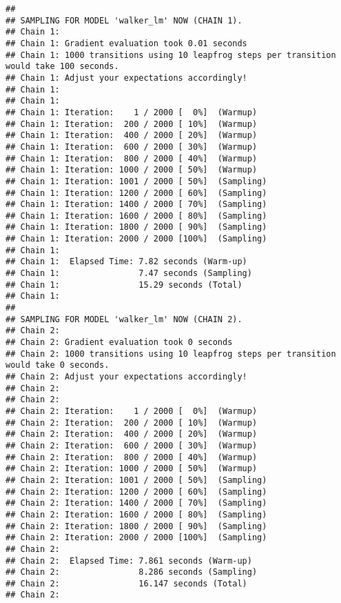 \documentclass[
]{book}
\newenvironment{Shaded}{\begin{snugshade}}{\end{snugshade}}
\newcommand{\AttributeTok}[1]{\textcolor[rgb]{0.77,0.63,0.00}{#1}}
\newcommand{\CommentTok}[1]{\textcolor[rgb]{0.56,0.35,0.01}{\textit{#1}}}
\newcommand{\DecValTok}[1]{\textcolor[rgb]{0.00,0.00,0.81}{#1}}
\newcommand{\FloatTok}[1]{\textcolor[rgb]{0.00,0.00,0.81}{#1}}
\newcommand{\FunctionTok}[1]{\textcolor[rgb]{0.00,0.00,0.00}{#1}}
\newcommand{\NormalTok}[1]{#1}
\newcommand{\SpecialCharTok}[1]{\textcolor[rgb]{0.00,0.00,0.00}{#1}}
\newcommand{\StringTok}[1]{\textcolor[rgb]{0.31,0.60,0.02}{#1}}
\begin{document}
\begin{verbatim}
## 
## SAMPLING FOR MODEL 'walker_lm' NOW (CHAIN 1).
## Chain 1: 
## Chain 1: Gradient evaluation took 0.01 seconds
## Chain 1: 1000 transitions using 10 leapfrog steps per transition would take 100 seconds.
## Chain 1: Adjust your expectations accordingly!
## Chain 1: 
## Chain 1: 
## Chain 1: Iteration:    1 / 2000 [  0%]  (Warmup)
## Chain 1: Iteration:  200 / 2000 [ 10%]  (Warmup)
## Chain 1: Iteration:  400 / 2000 [ 20%]  (Warmup)
## Chain 1: Iteration:  600 / 2000 [ 30%]  (Warmup)
## Chain 1: Iteration:  800 / 2000 [ 40%]  (Warmup)
## Chain 1: Iteration: 1000 / 2000 [ 50%]  (Warmup)
## Chain 1: Iteration: 1001 / 2000 [ 50%]  (Sampling)
## Chain 1: Iteration: 1200 / 2000 [ 60%]  (Sampling)
## Chain 1: Iteration: 1400 / 2000 [ 70%]  (Sampling)
## Chain 1: Iteration: 1600 / 2000 [ 80%]  (Sampling)
## Chain 1: Iteration: 1800 / 2000 [ 90%]  (Sampling)
## Chain 1: Iteration: 2000 / 2000 [100%]  (Sampling)
## Chain 1: 
## Chain 1:  Elapsed Time: 7.82 seconds (Warm-up)
## Chain 1:                7.47 seconds (Sampling)
## Chain 1:                15.29 seconds (Total)
## Chain 1: 
## 
## SAMPLING FOR MODEL 'walker_lm' NOW (CHAIN 2).
## Chain 2: 
## Chain 2: Gradient evaluation took 0 seconds
## Chain 2: 1000 transitions using 10 leapfrog steps per transition would take 0 seconds.
## Chain 2: Adjust your expectations accordingly!
## Chain 2: 
## Chain 2: 
## Chain 2: Iteration:    1 / 2000 [  0%]  (Warmup)
## Chain 2: Iteration:  200 / 2000 [ 10%]  (Warmup)
## Chain 2: Iteration:  400 / 2000 [ 20%]  (Warmup)
## Chain 2: Iteration:  600 / 2000 [ 30%]  (Warmup)
## Chain 2: Iteration:  800 / 2000 [ 40%]  (Warmup)
## Chain 2: Iteration: 1000 / 2000 [ 50%]  (Warmup)
## Chain 2: Iteration: 1001 / 2000 [ 50%]  (Sampling)
## Chain 2: Iteration: 1200 / 2000 [ 60%]  (Sampling)
## Chain 2: Iteration: 1400 / 2000 [ 70%]  (Sampling)
## Chain 2: Iteration: 1600 / 2000 [ 80%]  (Sampling)
## Chain 2: Iteration: 1800 / 2000 [ 90%]  (Sampling)
## Chain 2: Iteration: 2000 / 2000 [100%]  (Sampling)
## Chain 2: 
## Chain 2:  Elapsed Time: 7.861 seconds (Warm-up)
## Chain 2:                8.286 seconds (Sampling)
## Chain 2:                16.147 seconds (Total)
## Chain 2:
\end{verbatim}

\begin{Shaded}
\end{Shaded}
\end{document}
